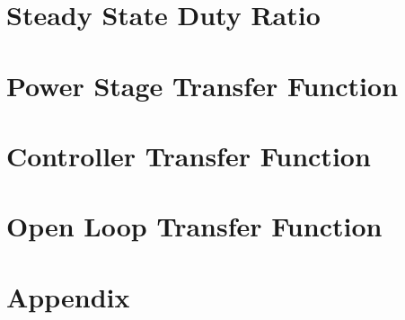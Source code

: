 

%


\vfill{}
\tableofcontents
\vfill{}
\clearpage

\part{Steady State Duty Ratio}
			\clearpage
\part{Power Stage Transfer Function}
			\clearpage
\part{Controller Transfer Function}
			\clearpage
\part{Open Loop Transfer Function}
			\clearpage
\part{Appendix}
		\clearpage
	

